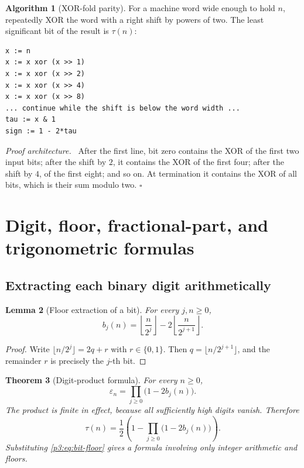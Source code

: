 \documentclass[11pt,oneside]{article}
\newtheorem{theorem}{Theorem}[section]
\newtheorem{lemma}[theorem]{Lemma}
\theoremstyle{definition}
\newtheorem{algorithm}[theorem]{Algorithm}
\theoremstyle{remark}
\newcommand{\eps}{\varepsilon}
\newcommand{\1}{\mathbf 1}
\newenvironment{proofidea}{\par\smallskip\noindent\textit{Proof architecture.}\ }{\hfill$\square$\par\smallskip}
\begin{document}
\begin{algorithm}[XOR-fold parity]
\label{p3:alg:xor-fold}
For a machine word wide enough to hold \(n\), repeatedly XOR the word with a right shift by
powers of two.  The least significant bit of the result is \(\tau(n)\):
\begin{lstlisting}[style=pseudo]
x := n
x := x xor (x >> 1)
x := x xor (x >> 2)
x := x xor (x >> 4)
x := x xor (x >> 8)
... continue while the shift is below the word width ...
tau := x & 1
sign := 1 - 2*tau
\end{lstlisting}
\end{algorithm}

\begin{proofidea}
After the first line, bit zero contains the XOR of the first two input bits; after the shift by
\(2\), it contains the XOR of the first four; after the shift by \(4\), of the first eight;
and so on.  At termination it contains the XOR of all bits, which is their sum modulo two.
\end{proofidea}

\section{Digit, floor, fractional-part, and trigonometric formulas}
\label{p3:sec:digits}

\subsection{Extracting each binary digit arithmetically}

\begin{lemma}[Floor extraction of a bit]
\label{p3:lem:bit-floor}
For every \(j,n\ge0\),
\begin{equation}
 b_j(n)=\left\lfloor\frac{n}{2^j}\right\rfloor
       -2\left\lfloor\frac{n}{2^{j+1}}\right\rfloor.
 \label{p3:eq:bit-floor}
\end{equation}
\end{lemma}

\begin{proof}
Write \(\lfloor n/2^j\rfloor=2q+r\) with \(r\in\{0,1\}\).  Then
\(q=\lfloor n/2^{j+1}\rfloor\), and the remainder \(r\) is precisely the \(j\)-th bit.
\end{proof}

\begin{theorem}[Digit-product formula]
\label{p3:thm:digit-product}
For every \(n\ge0\),
\begin{equation}
 \boxed{\eps_n=\prod_{j\ge0}\bigl(1-2b_j(n)\bigr)}.
 \label{p3:eq:digit-product}
\end{equation}
The product is finite in effect, because all sufficiently high digits vanish.  Therefore
\begin{equation}
 \tau(n)=\frac12\left(1-\prod_{j\ge0}\bigl(1-2b_j(n)\bigr)\right).
 \label{p3:eq:tau-digit-product}
\end{equation}
Substituting \eqref{p3:eq:bit-floor} gives a formula involving only integer arithmetic and floors.
\end{theorem}
\end{document}
